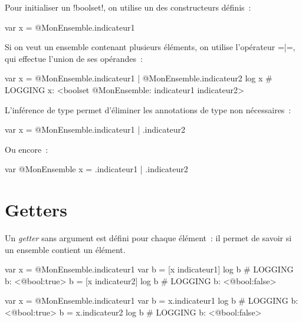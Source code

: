 Pour initialiser un \ggsq!boolset!, on utilise un des constructeurs définis~:
\begin{galgas34}
var x = @MonEnsemble.indicateur1
\end{galgas34}

Si on veut un ensemble contenant plusieurs éléments, on utilise l'opérateur \ggsq=|=, qui effectue l'union de ses opérandes~:
\begin{galgas34}
var x = @MonEnsemble.indicateur1 | @MonEnsemble.indicateur2
log x # LOGGING x: <boolset @MonEnsemble: indicateur1 indicateur2>
\end{galgas34}

L'inférence de type permet d'éliminer les annotations de type non nécessaires~:
\begin{galgas34}
var x = @MonEnsemble.indicateur1 | .indicateur2
\end{galgas34}

Ou encore~:
\begin{galgas34}
var @MonEnsemble x = .indicateur1 | .indicateur2
\end{galgas34}





















\section{Getters}

Un \emph{getter} sans argument est défini pour chaque élément~: il permet de savoir si un ensemble contient un élément.


\begin{galgas3}
var x = @MonEnsemble.indicateur1
var b = [x indicateur1]
log b # LOGGING b: <@bool:true>
b = [x indicateur2]
log b # LOGGING b: <@bool:false>
\end{galgas3}

\begin{galgas4}
var x = @MonEnsemble.indicateur1
var b = x.indicateur1
log b # LOGGING b: <@bool:true>
b = x.indicateur2
log b # LOGGING b: <@bool:false>
\end{galgas4}






